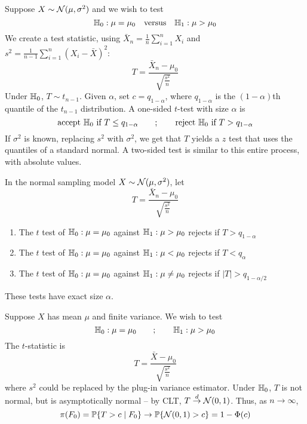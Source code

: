 \documentclass[10pt]{article}
\begin{document}
\begin{example}
	Suppose $X \sim \mathcal{N}(\mu,\sigma^2)$ and we wish to test
	\[
	\mathbb{H}_0 : \mu = \mu_0 \quad \text{versus} \quad \mathbb{H}_1 : \mu > \mu_0
	\]
	We create a test statistic, using $\bar{X}_n = \frac{1}{n}\sum_{i=1}^n X_i$ and $s^2 = \frac{1}{n-1}\sum_{i=1}^n (X_i - \bar{X})^2$:
	\[
	T=\frac{\bar{X}_n - \mu_0}{\sqrt{\frac{s^2}{n}}}
	\]
	Under $\mathbb{H}_0$, $T \sim t_{n-1}$. Given $\alpha$, set $c = q_{1-\alpha}$, where $q_{1-\alpha}$ is the $(1-\alpha)$th quantile of the $t_{n-1}$ distribution. A one-sided $t$-test with size $\alpha$ is
	\[
	\text{accept } \mathbb{H}_0 \text{ if } T \le q_{1-\alpha} \qquad ; \qquad \text{reject } \mathbb{H}_0 \text{ if } T > q_{1-\alpha}
	\]
	If $\sigma^2$ is known, replacing $s^2$ with $\sigma^2$, we get that $T$ yields a $z$ test that uses the quantiles of a standard normal. A two-sided test is similar to this entire process, with absolute values.
\end{example}

\begin{theorem}
	In the normal sampling model $X \sim \mathcal{N}(\mu,\sigma^2)$, let 
	\[
	T = \frac{\bar{X}_n - \mu_0}{\sqrt{\frac{s^2}{n}}}
	\]
	\begin{enumerate}
		\item The $t$ test of $\mathbb{H}_0: \mu = \mu_0$ against $\mathbb{H}_1 : \mu > \mu_0$ rejects if $T > q_{1-\alpha}$
		\item The $t$ test of $\mathbb{H}_0: \mu = \mu_0$ against $\mathbb{H}_1 : \mu < \mu_0$ rejects if $T < q_{\alpha}$
		\item The $t$ test of $\mathbb{H}_0: \mu = \mu_0$ against $\mathbb{H}_1 : \mu \ne \mu_0$ rejects if $|T| > q_{1-\alpha / 2}$
	\end{enumerate}
	These tests have exact size $\alpha$.
\end{theorem}

\begin{example}
	Suppose $X$ has mean $\mu$ and finite variance. We wish to test
	\[
	\mathbb{H}_0 : \mu = \mu_0 \qquad ; \qquad \mathbb{H}_1 : \mu > \mu_0
	\]
	The $t$-statistic is
	\[
	T = \frac{\bar{X} - \mu_0}{\sqrt{\frac{s^2}{n}}}
	\]
	where $s^2$ could be replaced by the plug-in variance estimator. Under $\mathbb{H}_0$, $T$ is not normal, but is asymptotically normal -- by CLT, $T \overset{d}{\to} \mathcal{N}(0,1)$. Thus, as $n \to \infty$, 
	\[
	\pi(F_0) = \mathbb{P}\{T > c \mid F_0\} \to \mathbb{P}\{\mathcal{N}(0,1) > c\} = 1 - \Phi(c)
	\]
\end{example}
\end{document}
